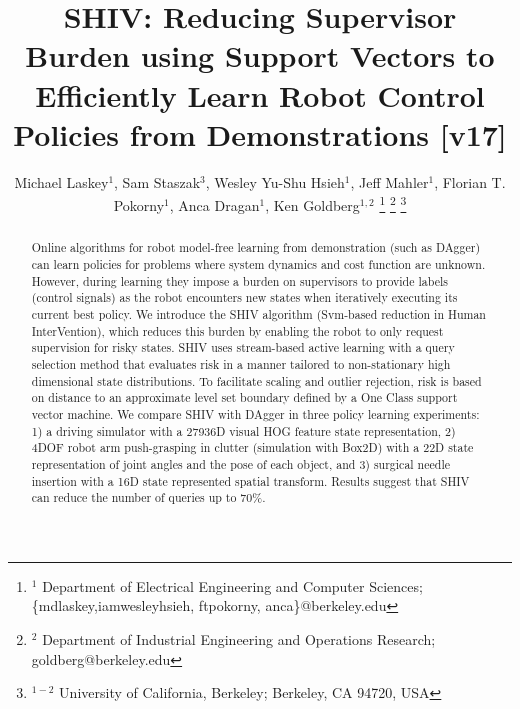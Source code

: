 \documentclass[10pt, conference]{ieeeconf}      %
\title{SHIV: Reducing Supervisor Burden using Support Vectors to Efficiently Learn Robot Control Policies from Demonstrations [v17]}
\author{Michael Laskey$^1$, Sam Staszak$^3$, Wesley Yu-Shu Hsieh$^1$, Jeff Mahler$^1$, Florian T. Pokorny$^1$, Anca Dragan$^1$, Ken Goldberg$^{1,2}$%
\thanks{$^1$ Department of Electrical Engineering and Computer Sciences; {\small \{mdlaskey,iamwesleyhsieh, ftpokorny, anca\}@berkeley.edu}}%
\thanks{$^2$ Department of Industrial Engineering and Operations Research; {\small goldberg@berkeley.edu}}%
\thanks{$^{1-2}$ University of California, Berkeley;  Berkeley, CA 94720, USA}%
}
\begin{document}
\maketitle
\thispagestyle{empty}
\pagestyle{empty}



\begin{abstract}
Online algorithms for robot model-free learning from demonstration (such as DAgger) can learn policies for problems where system
dynamics and cost function are unknown. However, during learning they impose a burden on supervisors to provide labels (control
signals) as the robot encounters new states when iteratively executing its current best policy. We introduce the SHIV
algorithm (Svm-based reduction in Human InterVention), which reduces this burden by enabling the robot to only request supervision for risky states. SHIV uses stream-based active learning with a query selection method that evaluates risk in a manner tailored to non-stationary high dimensional state distributions.  To facilitate scaling and outlier rejection, risk is based on distance to an approximate level set boundary defined by a One Class support vector machine.  We compare SHIV with DAgger in three policy learning experiments: 1) a driving simulator with a 27936D visual HOG feature state representation, 2) 4DOF robot arm push-grasping in clutter (simulation with Box2D) with a 22D state representation  of joint angles and the pose of each object, and 3) surgical needle insertion with a 16D state represented spatial transform.  Results suggest that SHIV can reduce the number of queries up to 70$\%$.





\end{abstract}
\end{document}
